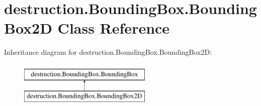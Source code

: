 \hypertarget{classdestruction_1_1_bounding_box_1_1_bounding_box2_d}{\section{destruction.\-Bounding\-Box.\-Bounding\-Box2\-D Class Reference}
\label{classdestruction_1_1_bounding_box_1_1_bounding_box2_d}
}
Inheritance diagram for destruction.\-Bounding\-Box.\-Bounding\-Box2\-D\-:\begin{figure}[H]
\begin{center}
\leavevmode
\includegraphics[height=2.000000cm]{classdestruction_1_1_bounding_box_1_1_bounding_box2_d}
\end{center}
\end{figure}
